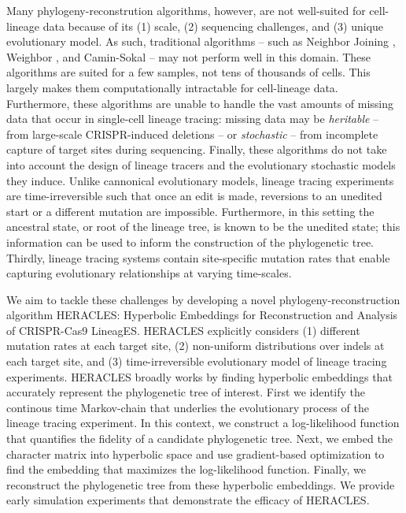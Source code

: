 \documentclass{article}
\begin{document}
Many phylogeny-reconstrution algorithms, however, are not well-suited for cell-lineage data because of its (1) scale, (2) sequencing challenges, and (3) unique evolutionary model. As such, traditional algorithms -- such as Neighbor Joining \cite{saitou1987neighbor}, Weighbor \cite{bruno2000}, and Camin-Sokal \cite{camin1965method} -- may not perform well in this domain. These algorithms are suited for a few samples, not tens of thousands of cells. This largely makes them computationally intractable for cell-lineage data. Furthermore, these algorithms are unable to handle the vast amounts of missing data that occur in single-cell lineage tracing: missing data may be \emph{heritable} -- from large-scale CRISPR-induced deletions -- or \emph{stochastic} -- from incomplete capture of target sites during sequencing. Finally, these algorithms do not take into account the design of lineage tracers and the evolutionary stochastic models they induce. Unlike cannonical evolutionary models, lineage tracing experiments are time-irreversible such that once an edit is made, reversions to an unedited start or a different mutation are impossible.  Furthermore, in this setting the ancestral state, or root of the lineage tree, is known to be the unedited state; this information can be used to inform the construction of the phylogenetic tree. Thirdly, lineage tracing systems contain site-specific mutation rates that enable capturing evolutionary relationships at varying time-scales.

We aim to tackle these challenges by developing a novel phylogeny-reconstruction algorithm HERACLES: Hyperbolic Embeddings for Reconstruction and Analysis of CRISPR-Cas9 LineagES. HERACLES explicitly considers (1) different mutation rates at each target site, (2) non-uniform distributions over indels at each target site, and (3) time-irreversible evolutionary model of lineage tracing experiments. HERACLES broadly works by finding hyperbolic embeddings that accurately represent the phylogenetic tree of interest. First we identify the continous time Markov-chain that underlies the evolutionary process of the lineage tracing experiment. In this context, we construct a log-likelihood function that quantifies the fidelity of a candidate phylogenetic tree. Next, we embed the character matrix into hyperbolic space and use gradient-based optimization to find the embedding that maximizes the log-likelihood function. Finally, we reconstruct the phylogenetic tree from these hyperbolic embeddings. We provide early simulation experiments that demonstrate the efficacy of HERACLES.
\end{document}
